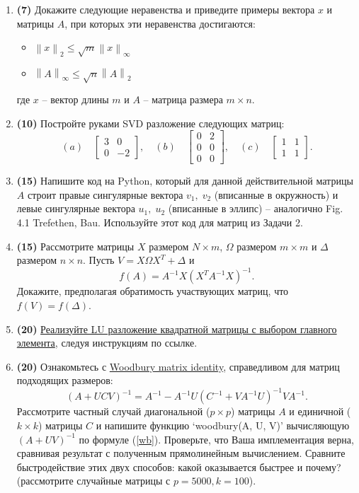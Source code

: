 \documentclass[10pt]{article}
\newcommand{\norm}[1]{\left\lVert#1\right\rVert}
\begin{document}
\begin{enumerate}
\item \textbf{(7)} Докажите следующие неравенства и приведите примеры вектора $x$ и матрицы $A$, при которых эти неравенства достигаются:
\begin{itemize}
\item $\norm{x}_2 \le \sqrt{m}\norm{x}_\infty$
\item $\norm{A}_\infty \le \sqrt{n} \norm{A}_2$
\end{itemize}
где $x$ -- вектор длины $m$ и $A$ -- матрица размера $m\times n$.

\item \textbf{(10)} Постройте руками SVD разложение следующих матриц:
$$
(a)\quad\begin{bmatrix}
3 & 0\\
0 & -2
\end{bmatrix},\quad
(b)\quad\begin{bmatrix}
0 & 2\\
0 & 0\\
0 & 0
\end{bmatrix},\quad
(c)\quad\begin{bmatrix}
1 & 1\\
1 & 1
\end{bmatrix}.
$$

\item \textbf{(15)} Напишите код на Python, который для данной действительной матрицы $A$ строит правые сингулярные вектора $v_1,\; v_2$ (вписанные в окружность) и  левые сингулярные вектора $u_1,\; u_2$ (вписанные в эллипс) -- аналогично Fig. 4.1 Trefethen, Bau. Используйте этот код для матриц из Задачи 2.

\item \textbf{(15)} Рассмотрите матрицы $X$ размером $N\times m$, $ \Omega$ размером $m\times m$ и $ \Delta$ размером $n\times n$. Пусть $V = X \Omega X^T + \Delta$  и
$$
f(A) = A^{-1}X(X^T A^{-1}X)^{-1}.
$$
Докажите, предполагая обратимость участвующих матриц, что $f(V)=f(\Delta)$.

\item \textbf{(20)} \href{https://github.com/ev-br/CP2020/blob/master/week_1_LU_pivoting.ipynb}{Реализуйте LU разложение квадратной матрицы с выбором главного элемента}, следуя инструкциям по ссылке.

\item \textbf{(20)} Ознакомьтесь с \href{https://en.wikipedia.org/wiki/Woodbury_matrix_identity}{Woodbury matrix identity}, справедливом для матриц подходящих размеров:
\begin{equation}
\label{wb}
\left(A+UCV\right)^{-1}=A^{-1}-A^{-1}U\left(C^{-1}+VA^{-1}U\right)^{-1}VA^{-1}.
\end{equation}
Рассмотрите частный случай диагональной ($p\times p$) матрицы $A$ и единичной ($k\times k$) матрицы $C$ и напишите функцию `woodbury(A, U, V)' вычисляющую $\left(A+UV\right)^{-1}$ по формуле (\ref{wb}). Проверьте, что Ваша имплементация верна, сравнивая результат с полученным прямолинейным вычислением.
Сравните быстродействие этих двух способов: какой оказывается быстрее и почему? (рассмотрите случайные матрицы с $p = 5000, k = 100$).




\end{enumerate}
\end{document}

